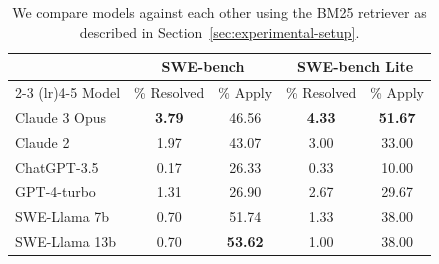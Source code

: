 \begin{table}
\centering
\caption{
We compare models against each other using the BM25 retriever as described in Section~\ref{sec:experimental-setup}.
}
\begin{tabular}{lcccc}
\toprule
& \multicolumn{2}{c}{SWE-bench} & \multicolumn{2}{c}{SWE-bench Lite} \\
\cmidrule(lr){2-3} \cmidrule(lr){4-5}  %
Model & \% Resolved & \% Apply & \% Resolved & \% Apply \\
\midrule
Claude 3 Opus   & {\bf 3.79} & 46.56        & {\bf 4.33} & {\bf 51.67} \\
Claude 2        & 1.97       & 43.07        & 3.00       & 33.00       \\
ChatGPT-3.5     & 0.17       & 26.33        & 0.33       & 10.00       \\ 
GPT-4-turbo     & 1.31       & 26.90        & 2.67       & 29.67       \\
SWE-Llama 7b    & 0.70       & 51.74        & 1.33       & 38.00       \\
SWE-Llama 13b   & 0.70       & {\bf 53.62}  & 1.00       & 38.00       \\
\bottomrule
\end{tabular}
\label{table:main-results}
\end{table}
